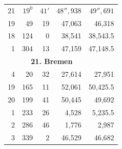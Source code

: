 \begin{landscape}
\begin{minipage}[t]{.32\linewidth}
\begin{tabular}{r|rrr|r}
21&\(19^{0}\)&\(41'\)&\(48''{,}938\)&\(49''{,}691\)\\
19&49&19&47,063&46,318\\
18&124&0&38,541&38,543.5\\
1&304&13&47,159&47,148.5\\[6pt]
&\multicolumn{3}{c|}{\textbf{21. Bremen}}&\\[3pt]
4&20&32&27,614&27,951\\
19&165&11&52,061&50,425.5\\
20&199&41&50,445&49,692\\
1&233&26&4,528&5,235.5\\
2&286&46&1,776&2,987\\
3&339&2&46,529&46,682
\end{tabular}
\end{minipage}
\par\endgroup
\end{landscape}
\clearpage
